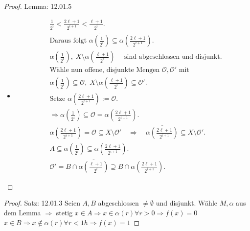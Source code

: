 \begin{proof}{Lemma: 12.01.5}
\begin{itemize}
\begin{itemize}
\begin{itemize}
        \item[Fall: $l\in \{1,\dots,2^{l-2}\}$] 
        \begin{equation*}
            \begin{split}
                & \frac{1}{2^i} < \frac{2\ell+1}{2^{i+1}} < \frac{\ell+1}{2^i}.\\
                &\text{Daraus folgt } \overline{\alpha\left(\frac{1}{2^i}\right)} \subseteq
                \alpha\left(\frac{2\ell+1}{2^{i+1}}\right).\\
                &\alpha\left(\frac{1}{2^i}\right),\;
                X \setminus \alpha\left( \tfrac{\ell+1}{2^i}\right)
                \quad\text{ sind abgeschlossen und disjunkt}.\\
                &\text{Wähle nun offene, disjunkte Mengen } \mathcal{O}, \mathcal{O}' \text{ mit}\\
                &\alpha\left(\tfrac{1}{2^i}\right) \subseteq \mathcal{O},
                \; X \setminus \alpha\left( \tfrac{\ell+1}{2^i}\right) \subseteq \mathcal{O}'.\\
                &\text{Setze } \alpha\left( \frac{2\ell+1}{2^{i+1}}\right) := \mathcal{O}.\\
                &\Rightarrow \alpha\left(\tfrac{1}{2^i}\right) \subseteq \mathcal{O}
                = \alpha\left( \tfrac{2\ell+1}{2^{i+1}} \right).\\
                &\alpha\left( \tfrac{2\ell+1}{2^{i+1}} \right)
                = \mathcal{O} \subseteq X \setminus \mathcal{O}'
                \quad\Longrightarrow\quad
                \overline{\alpha\left( \tfrac{2\ell+1}{2^{i+1}} \right)}
                \subseteq X \setminus \mathcal{O}'.\\
                & A \subseteq \alpha\left(\tfrac{1}{2^i}\right)
                \subseteq \alpha\left( \tfrac{2\ell+1}{2^{i+1}} \right).\\
                & \mathcal{O}' = B \cap \overline{\alpha\left( \tfrac{\ell+1}{2^i} \right)}
                \supseteq B \cap \alpha\left( \tfrac{2\ell+1}{2^{i+1}} \right).
            \end{split}
        \end{equation*}
        \end{itemize}
    \end{itemize}
\end{itemize}
\end{proof}

\begin{proof}{Satz: 12.01.3}
    Seien $A, B$ abgeschlossen $\neq \emptyset$ und disjunkt.
    Wähle $M,\alpha$ aus dem Lemma $\Rightarrow$ stetig $x \in A 
    \Rightarrow x \in \alpha(r) \forall r > 0 \Rightarrow f(x) = 0$
    $x \in B \Rightarrow x \notin \alpha(r) \forall r < 1 
   h \Rightarrow f(x)=1$
\end{proof}

